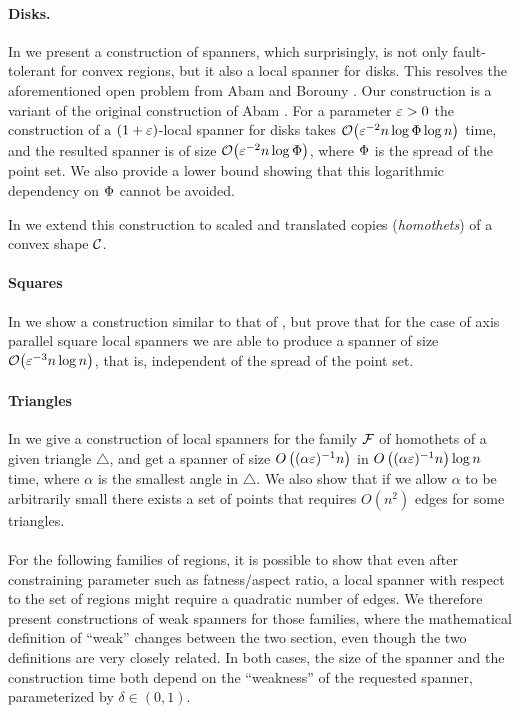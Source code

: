 \documentclass[12pt]{article}%
\begin{document}
\paragraph{Disks.}
In  we present a construction of spanners, which
surprisingly, is not only fault-tolerant for convex regions, but it
also a local spanner for disks. This resolves the aforementioned open
problem from Abam and Borouny \cite{ab-lgs-21}. Our construction is a
variant of the original construction of Abam \etal
\cite{abfg-rftgs-09}. For a parameter $\varepsilon>0$ the construction of a
$(1+\varepsilon)$-local spanner for disks takes
$\Of\pth{ \eps^{-2} n\log \spread \log n }$ time, and the resulted
spanner is of size $\Of\pth{ \eps^{-2} n\log \spread }$, where
$\Phi$ is the spread of the point set. We also provide a lower
bound showing that this logarithmic dependency on $\Phi$ cannot be
avoided.

In  we extend this construction to scaled and
translated copies (\emph{homothets}) of a convex shape $\mathcal{C}$.

\paragraph{Squares}
In  we show a construction similar to that of
, but prove that for the case of axis parallel square
local spanners we are able to produce a spanner of size
$\Of\pth{\eps^{-3} n \log n}$, that is, independent of the spread of
the point set.

\paragraph{Triangles}
In  we give a construction of local spanners for the
family $\mathcal{F}$ of homothets of a given triangle $\triangle$, and get a
spanner of size $O\left((\alpha\varepsilon)^{-1}n\right)$ in
$O\left((\alpha\varepsilon)^{-1}n\right)\log n$ time, where $\alpha$ is the
smallest angle in $\triangle$. We also show that if we allow $\alpha$
to be arbitrarily small there exists a set of points that requires
$O(n^2)$ edges for some triangles.

\paragraph{}
For the following families of regions, it is possible to show that
even after constraining parameter such as fatness/aspect ratio, a
local spanner with respect to the set of regions might require a
quadratic number of edges. We therefore present constructions of weak
spanners for those families, where the mathematical definition of
``weak'' changes between the two section, even though the two
definitions are very closely related. In both cases, the size of the
spanner and the construction time both depend on the ``weakness'' of
the requested spanner, parameterized by $\delta\in (0,1)$.
\end{document}
